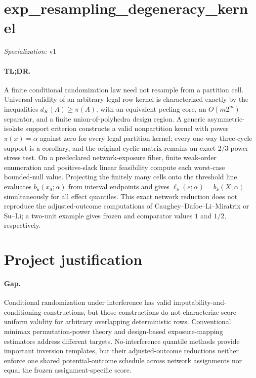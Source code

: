 \documentclass{article}
\begin{document}
\sloppy

\section*{exp\_\allowbreak{}resampling\_\allowbreak{}degeneracy\_\allowbreak{}kernel}

\noindent\textit{Specialization:} v1\par

\paragraph{TL;DR.} A finite conditional randomization law need not resample from a partition cell. Universal validity of an arbitrary legal row kernel is characterized exactly by the inequalities \(d_K(A)\geq\pi(A)\), with an equivalent peeling core, an \(O(m2^m)\) separator, and a finite union-of-polyhedra design region. A generic asymmetric-isolate support criterion constructs a valid nonpartition kernel with power \(\pi(x)=\alpha\) against zero for every legal partition kernel; every one-way three-cycle support is a corollary, and the original cyclic matrix remains an exact \(2/3\)-power stress test. On a predeclared network-exposure fiber, finite weak-order enumeration and positive-slack linear feasibility compute each worst-case bounded-null value. Projecting the finitely many cells onto the threshold line evaluates \(b_k(x_0;\alpha)\) from interval endpoints and gives \(\ell_k(e;\alpha)=b_k(X;\alpha)\) simultaneously for all effect quantiles. This exact network reduction does not reproduce the adjusted-outcome computations of Caughey--Dafoe--Li--Miratrix or Su--Li; a two-unit example gives frozen and comparator values \(1\) and \(1/2\), respectively.

\section{Project justification}

\paragraph{Gap.} Conditional randomization under interference has valid imputability-and-conditioning constructions, but those constructions do not characterize score-uniform validity for arbitrary overlapping deterministic rows. Conventional minimax permutation-power theory and design-based exposure-mapping estimators address different targets. No-interference quantile methods provide important inversion templates, but their adjusted-outcome reductions neither enforce one shared potential-outcome schedule across network assignments nor equal the frozen assignment-specific score.
\end{document}

